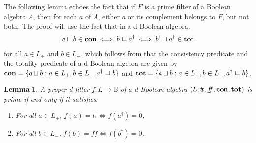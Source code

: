 \documentclass[11pt]{article}
\theoremstyle{plain}
\newtheorem{lem}[thm]{Lemma}
\theoremstyle{definition}
\newcommand{\bbB}{\mathbb{B}}
\newcommand{\dbt}{{t\!t}}
\newcommand{\dbf}{{f\!\!f}}
\newcommand{\lra}{\longrightarrow}
\begin{document}
The following lemma echoes the fact that if $F$ is a prime filter of a Boolean algebra $A$, then for each $a$ of $A$,   either $a$ or its  complement belongs to $F$, but not both. The proof will use the fact that in a d-Boolean algebra, $$a\sqcup b \in {\bf con}\iff b\sqsubseteq a^\dag \iff b^\dag\sqcup a^\dag\in  {\bf tot} $$ for all $a\in L_{+}$ and $b\in L_{-}$,  
which follows from that the consistency predicate and the totality predicate of a d-Boolean algebra are given by ${\bf con}=\{a\sqcup b: a\in L_+, b\in  L_-, a^\dag\sqsupseteq b \}$ and ${\bf tot}=\{a\sqcup b: a\in L_+, b\in  L_-,a^\dag\sqsubseteq b\}$.   
   
\begin{lem}\label{prime d-filter} 
A proper d-filter  $f\colon L\lra \bbB$ of a d-Boolean algebra $(L;\dbt,\dbf;{\bf con},{\bf tot})$  is prime if and only if it  satisfies:  \begin{enumerate}[label=\rm(\alph*)] \setlength{\itemsep}{0pt}  \item For all $a\in L_+$, $f(a)=\dbt \iff f(a^\dag)=0$; \item For all $b\in L_-$, $f(b)=\dbf \iff f(b^\dag)=0$.  \end{enumerate}   \end{lem}
\end{document}
